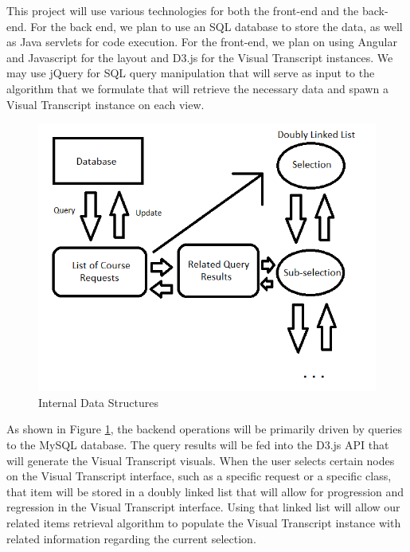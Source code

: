 \textnormal{This project will use various technologies for both the front-end and the back-end. For the back end, we plan to use an SQL database to store the data, as well as Java servlets for code execution. For the front-end, we plan on using Angular and Javascript for the layout and D3.js for the Visual Transcript instances. We may use jQuery for SQL query manipulation that will serve as input to the algorithm that we formulate that will retrieve the necessary data and spawn a Visual Transcript instance on each view.}

\begin{figure}
	\includegraphics[width=\linewidth]{Data_Structures.png}
	\caption{Internal Data Structures}
	\label{fig:fig1}
\end{figure}

As shown in Figure \ref{fig:fig1}, the backend operations will be primarily driven by queries to the MySQL database. The query results will be fed into the D3.js API that will generate the Visual Transcript visuals. When the user selects certain nodes on the Visual Transcript interface, such as a specific request or a specific class, that item will be stored in a doubly linked list that will allow for progression and regression in the Visual Transcript interface.  Using that linked list will allow our related items retrieval algorithm to populate the Visual Transcript instance with related information regarding the current selection. 
\\\\